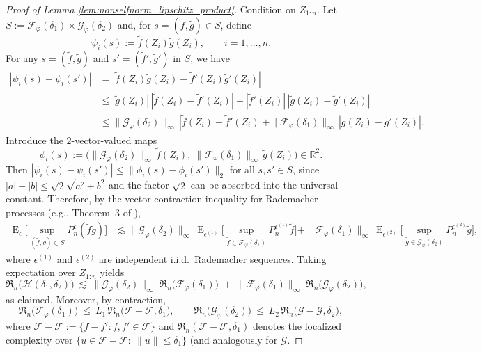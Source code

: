 \documentclass[11pt]{article}
\theoremstyle{plain}
\theoremstyle{definition} %
\DeclareMathOperator{\E}{E}
\begin{document}
\begin{proof}[Proof of Lemma \ref{lem:nonselfnorm_lipschitz_product}]
Condition on $Z_{1:n}$. Let $S:=\mathcal F_{\varphi}(\delta_1)\times \mathcal G_{\varphi}(\delta_2)$ and, for
$s=(\tilde f,\tilde g)\in S$, define
\[
\psi_i(s):=\tilde f(Z_i)\tilde g(Z_i),
\qquad i=1,\dots,n.
\]
For any $s=(\tilde f,\tilde g)$ and $s'=(\tilde f',\tilde g')$ in $S$, we have
\begin{align*}
|\psi_i(s)-\psi_i(s')|
&=
|\tilde f(Z_i)\tilde g(Z_i)-\tilde f'(Z_i)\tilde g'(Z_i)|\\
&\le
|\tilde g(Z_i)|\,|\tilde f(Z_i)-\tilde f'(Z_i)|
+
|\tilde f'(Z_i)|\,|\tilde g(Z_i)-\tilde g'(Z_i)|\\
&\le
\|\mathcal G_{\varphi}(\delta_2)\|_\infty\,|\tilde f(Z_i)-\tilde f'(Z_i)|
+
\|\mathcal F_{\varphi}(\delta_1)\|_\infty\,|\tilde g(Z_i)-\tilde g'(Z_i)|.
\end{align*}
Introduce the $2$-vector-valued maps
\[
\phi_i(s)
:=
\bigl(
\|\mathcal G_{\varphi}(\delta_2)\|_\infty\,\tilde f(Z_i),\
\|\mathcal F_{\varphi}(\delta_1)\|_\infty\,\tilde g(Z_i)
\bigr)\in\mathbb R^2.
\]
Then $|\psi_i(s)-\psi_i(s')|\le \|\phi_i(s)-\phi_i(s')\|_2$ for all $s,s'\in S$, since
$|a|+|b|\le \sqrt{2}\sqrt{a^2+b^2}$ and the factor $\sqrt{2}$ can be absorbed into the universal constant.
Therefore, by the vector contraction inequality for Rademacher processes (e.g., Theorem~3 of \citet{maurer2016vector}),
\begin{align*}
\E_{\epsilon}\Big[\sup_{(\tilde f,\tilde g)\in S} P_n^\epsilon(\tilde f\tilde g)\Big]
&\lesssim
\|\mathcal G_{\varphi}(\delta_2)\|_\infty\,
\E_{\epsilon^{(1)}}\Big[\sup_{\tilde f\in\mathcal F_{\varphi}(\delta_1)} P_n^{\epsilon^{(1)}}\tilde f\Big]
+
\|\mathcal F_{\varphi}(\delta_1)\|_\infty\,
\E_{\epsilon^{(2)}}\Big[\sup_{\tilde g\in\mathcal G_{\varphi}(\delta_2)} P_n^{\epsilon^{(2)}}\tilde g\Big],
\end{align*}
where $\epsilon^{(1)}$ and $\epsilon^{(2)}$ are independent i.i.d.\ Rademacher sequences.
Taking expectation over $Z_{1:n}$ yields
\[
\mathfrak R_n\bigl(\mathcal H(\delta_1,\delta_2)\bigr)
\ \lesssim\
\|\mathcal G_{\varphi}(\delta_2)\|_\infty\; \mathfrak R_n\bigl(\mathcal F_{\varphi}(\delta_1)\bigr)
\;+\;
\|\mathcal F_{\varphi}(\delta_1)\|_\infty\; \mathfrak R_n\bigl(\mathcal G_{\varphi}(\delta_2)\bigr),
\]
as claimed.
Moreover, by contraction,
\[
\mathfrak R_n\bigl(\mathcal F_{\varphi}(\delta_1)\bigr)
\ \le\ 
L_1\,\mathfrak R_n\bigl(\mathcal F-\mathcal F,\delta_1\bigr),
\qquad
\mathfrak R_n\bigl(\mathcal G_{\varphi}(\delta_2)\bigr)
\ \le\ 
L_2\,\mathfrak R_n\bigl(\mathcal G-\mathcal G,\delta_2\bigr),
\]
where $\mathcal F-\mathcal F:=\{f-f': f,f'\in\mathcal F\}$ and
$\mathfrak R_n(\mathcal F-\mathcal F,\delta_1)$ denotes the localized complexity over
$\{u\in\mathcal F-\mathcal F:\ \|u\|\le \delta_1\}$ (and analogously for $\mathcal G$.

\end{proof}
 
\end{document}
